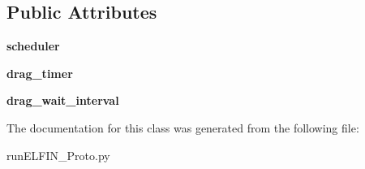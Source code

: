 \subsection*{Public Attributes}
\begin{DoxyCompactItemize}
\item 
\hypertarget{classrunELFIN__Proto_1_1MyMainWindow_a45e7c63b1e0cbe5cee870efa69b1f983}{{\bfseries scheduler}}\label{classrunELFIN__Proto_1_1MyMainWindow_a45e7c63b1e0cbe5cee870efa69b1f983}

\item 
\hypertarget{classrunELFIN__Proto_1_1MyMainWindow_a5ecf9793b56752f03a542b4ade9a7827}{{\bfseries drag\-\_\-timer}}\label{classrunELFIN__Proto_1_1MyMainWindow_a5ecf9793b56752f03a542b4ade9a7827}

\item 
\hypertarget{classrunELFIN__Proto_1_1MyMainWindow_a20694434bff9a7129222d3319e40cf9e}{{\bfseries drag\-\_\-wait\-\_\-interval}}\label{classrunELFIN__Proto_1_1MyMainWindow_a20694434bff9a7129222d3319e40cf9e}

\end{DoxyCompactItemize}


The documentation for this class was generated from the following file\-:\begin{DoxyCompactItemize}
\item 
run\-E\-L\-F\-I\-N\-\_\-\-Proto.\-py\end{DoxyCompactItemize}
